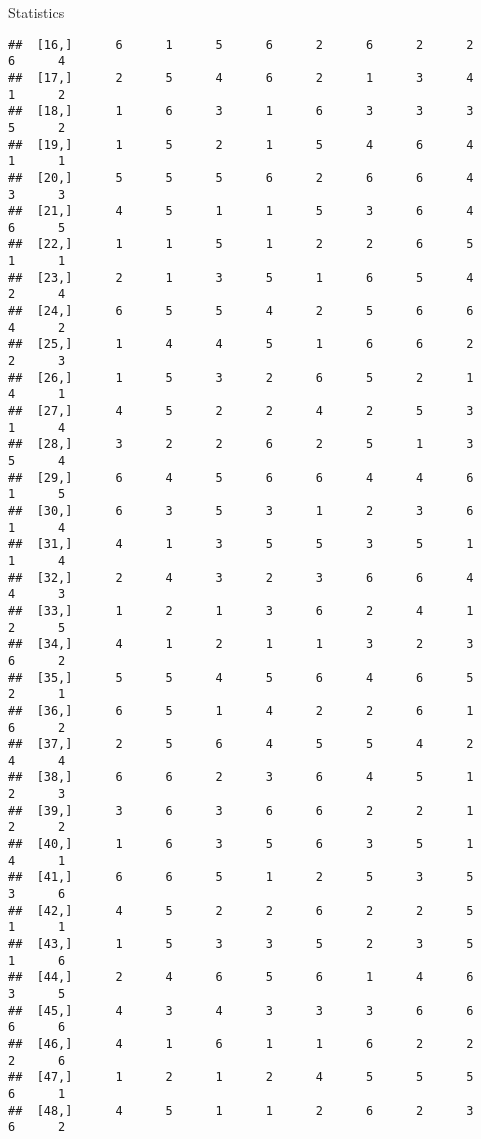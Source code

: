 \documentclass[
  ignorenonframetext,
]{beamer}
\begin{document}
\begin{frame}[fragile]{Statistics}
\begin{verbatim}
##  [16,]      6      1      5      6      2      6      2      2      6      4
##  [17,]      2      5      4      6      2      1      3      4      1      2
##  [18,]      1      6      3      1      6      3      3      3      5      2
##  [19,]      1      5      2      1      5      4      6      4      1      1
##  [20,]      5      5      5      6      2      6      6      4      3      3
##  [21,]      4      5      1      1      5      3      6      4      6      5
##  [22,]      1      1      5      1      2      2      6      5      1      1
##  [23,]      2      1      3      5      1      6      5      4      2      4
##  [24,]      6      5      5      4      2      5      6      6      4      2
##  [25,]      1      4      4      5      1      6      6      2      2      3
##  [26,]      1      5      3      2      6      5      2      1      4      1
##  [27,]      4      5      2      2      4      2      5      3      1      4
##  [28,]      3      2      2      6      2      5      1      3      5      4
##  [29,]      6      4      5      6      6      4      4      6      1      5
##  [30,]      6      3      5      3      1      2      3      6      1      4
##  [31,]      4      1      3      5      5      3      5      1      1      4
##  [32,]      2      4      3      2      3      6      6      4      4      3
##  [33,]      1      2      1      3      6      2      4      1      2      5
##  [34,]      4      1      2      1      1      3      2      3      6      2
##  [35,]      5      5      4      5      6      4      6      5      2      1
##  [36,]      6      5      1      4      2      2      6      1      6      2
##  [37,]      2      5      6      4      5      5      4      2      4      4
##  [38,]      6      6      2      3      6      4      5      1      2      3
##  [39,]      3      6      3      6      6      2      2      1      2      2
##  [40,]      1      6      3      5      6      3      5      1      4      1
##  [41,]      6      6      5      1      2      5      3      5      3      6
##  [42,]      4      5      2      2      6      2      2      5      1      1
##  [43,]      1      5      3      3      5      2      3      5      1      6
##  [44,]      2      4      6      5      6      1      4      6      3      5
##  [45,]      4      3      4      3      3      3      6      6      6      6
##  [46,]      4      1      6      1      1      6      2      2      2      6
##  [47,]      1      2      1      2      4      5      5      5      6      1
##  [48,]      4      5      1      1      2      6      2      3      6      2

\end{verbatim}
\end{frame}
\end{document}
